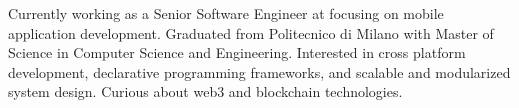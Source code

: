 
\begin{cvparagraph}

Currently working as a Senior Software Engineer at  focusing on mobile application development. Graduated from Politecnico di Milano with Master of Science in Computer Science and Engineering. Interested in cross platform development, declarative programming frameworks, and scalable and modularized system design. Curious about web3 and blockchain technologies.
\end{cvparagraph}

%